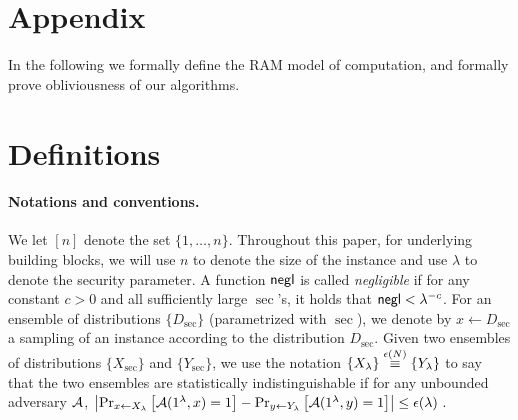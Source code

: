 
\newcommand{\memsize}{{N}}
\newcommand{\blocksize}{{b}}
\newcommand{\negl}{{\sf negl}}
\newcommand{\Y}{{\bf Y}}

\section*{Appendix}
In the following we formally define the RAM model of computation, and formally prove obliviousness of our algorithms. 

\section{Definitions}
\label{sec:defs}

\paragraph{Notations and conventions.}
We let $[n]$ denote the set $\{1,\ldots,n\}$. Throughout this paper, for underlying building blocks, we will use
$n$ to denote the size of the instance and use $\lambda$ 
to denote the security parameter. 
A function $\negl$ is called \emph{negligible} if for any constant $c > 0$ and all sufficiently large $\sec$'s, it holds that $\negl < \sec^{-c}$. 
For an ensemble of distributions $\{D_\sec\}$ (parametrized with $\sec$),
we denote by $x \leftarrow D_\sec$ a sampling of an instance according to the distribution $D_\sec$. 
Given two ensembles of distributions $\{X_\sec\}$ and $\{Y_\sec\}$, 
we use the notation $\{X_{\lambda}\} \overset{{\epsilon}(N)}{\equiv} \{Y_{\lambda}\}$ 
to say that the two ensembles are statistically indistinguishable if for any unbounded adversary ${\cal A}$, 
$
\left|\Pr_{x\leftarrow X_{\lambda}}\left[{\cal A}(1^\lambda, x)=1\right] - \Pr_{y\leftarrow Y_{\lambda}}\left[{\cal A}(1^\lambda, y)=1\right] \right| \leq {\epsilon}({\lambda}) \ .
$



